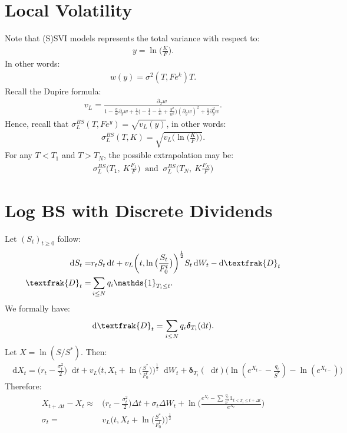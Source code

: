 \documentclass[a4paper, 11pt]{article}              %
\numberwithin{equation}{section}
\theoremstyle{plain}
\newcommand{\1}{\mathds{1}}
\newcommand{\frD}{\textfrak{D}}
\newcommand{\SUM}{\displaystyle\sum}
\theoremstyle{plain}
\theoremstyle{definition}
\theoremstyle{plain}
\newcommand*\df{\mathop{}\!\mathrm{d}}
\begin{document}
\section{Local Volatility}
Note that (S)SVI models represents the total variance with respect to:
\begin{align}
y = \ln\big(\frac{K}{F}\big).
\end{align}
In other words:
\begin{align}
  w(y) = \sigma^2(T, Fe^k)T. 
\end{align}
Recall the Dupire formula:
\begin{align}
  v_L = \frac{\partial_T w}{1-\frac{y}{w}\partial_y w
  +\frac{1}{4}\Big(-\frac{1}{4} - \frac{1}{w} +
  \frac{y^2}{w^2}\Big)(\partial_y w)^2 + \frac{1}{2}\partial^2_y w}.
\end{align}
Hence, recall that $\sigma^{BS}_L(T, Fe^y) = \sqrt{v_L(y)}$, in other words:
\begin{align}
 \sigma^{BS}_L(T, K) = \sqrt{v_L\bigg(\ln\big(\frac{K}{F}\big)\bigg)}.
\end{align}
For any $T <  T_1$ and $T >  T_N$, the possible extrapolation may be:
\begin{align}
  \sigma^{BS}_L\bigg(T_1, ~K\frac{F_1}{F}\bigg) ~\text{ and }~ \sigma^{BS}_L\bigg(T_N, ~K\frac{F_N}{F}\bigg)
\end{align}

\section{Log BS with Discrete Dividends}
Let $(S_t)_{t \geq 0}$ follow:
\begin{align}
  \df S_t =& r_tS_t \df t +  v_L\bigg(t,
             \ln\big(\frac{S_t}{F^t_0}\big)\bigg)^{\frac{1}{2}} S_t \df W_t
             - \df \frD_t \nonumber\\
  \frD_t =& \SUM_{i \leq N}q_i \1_{T_i \leq t}. \nonumber
\end{align}
We formally have:
\begin{align}
  \df \frD_t = \SUM_{i \leq N} q_i \bm{\delta}_{T_i}(\df t).
\end{align}
Let $X = \ln (S / S^*)$. Then:
\begin{align}
  \df X_t =  \big(r_t - \frac{\sigma_t^2}{2}\big) \df t
  +v_L\bigg(t, X_t+\ln\big(\frac{S^*}{F^t_0}\big)\bigg)^{\frac{1}{2}} \df W_t
  +\bm{\delta}_{T_i}(\df t)\big(\ln(e^{X_{t-}}-\frac{q_i}{S^*}) - \ln(e^{X_{t-}})\big) 
\end{align}
Therefore:
\begin{align}
  X_{t+\Delta t} - X_t \approx&
   \big(r_t -
  \frac{\sigma_t^2}{2}\big) \Delta t
  +\sigma_t \Delta W_t
  + \ln\Big(\frac{e^{X_t} - \SUM \frac{q_i}{S^*} \1_{t < T_i \leq t + \Delta
                                t}}{e^{X_t}}\Big) \nonumber\\
  \sigma_t = &v_L\bigg(t, X_t+\ln\big(\frac{S^*}{F^t_0}\big)\bigg)^{\frac{1}{2}} \nonumber
\end{align}
\end{document}
